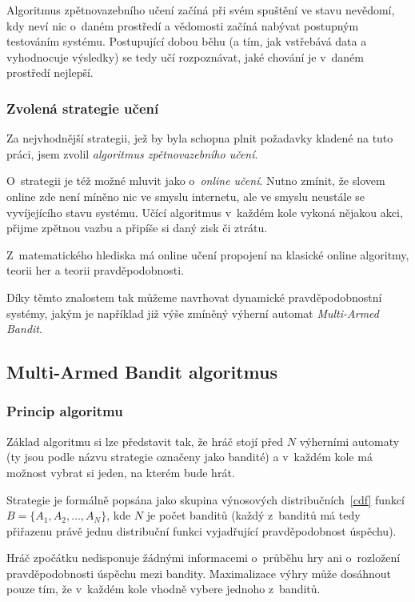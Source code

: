 \documentclass[thesis=M,czech]{FITthesis}[2014/05/07]
\begin{document}
Algoritmus zpětnovazebního učení začíná při svém spuštění ve stavu nevědomí, kdy neví nic o~daném prostředí a vědomosti začíná nabývat postupným testováním systému. Postupující dobou běhu (a tím, jak vstřebává data a vyhodnocuje výsledky) se tedy učí rozpoznávat, jaké chování je v~daném prostředí nejlepší.

\subsubsection{Zvolená strategie učení}
\label{sub:online}
Za nejvhodnější strategii, jež by byla schopna plnit požadavky kladené na tuto práci, jsem zvolil \emph{algoritmus zpětnovazebního učení}.

O~strategii je též možné mluvit jako o~\emph{online učení}. Nutno zmínit, že slovem online zde není míněno nic ve smyslu internetu, ale ve smyslu neustále se vyvíjejícího stavu systému. Učící algoritmus v~každém kole vykoná nějakou akci, přijme zpětnou vazbu a připíše si daný zisk či ztrátu.

Z~matematického hlediska má online učení propojení na klasické online algoritmy, teorii her a teorii pravděpodobnosti.

Díky těmto znalostem tak můžeme navrhovat dynamické pravděpodobnostní systémy, jakým je například již výše zmíněný výherní automat \emph{Multi-Armed Bandit}.

\subsection{Multi-Armed Bandit algoritmus}
\label{sec:multi}

\subsubsection{Princip algoritmu}
Základ algoritmu si lze představit tak, že hráč stojí před $N$ výherními automaty (ty jsou podle názvu strategie označeny jako bandité) a v~každém kole má možnost vybrat si jeden, na kterém bude hrát.

Strategie je formálně popsána jako skupina výnosových distribučních~\ref{cdf} funkcí $B = \{ A_1, A_2, \ldots, A_N \}$, kde $N$ je počet banditů (každý z~banditů má tedy přiřazenu právě jednu distribuční funkci vyjadřující pravděpodobnost úspěchu). 

Hráč zpočátku nedisponuje žádnými informacemi o~průběhu hry ani o~rozložení pravděpodobnosti úspěchu mezi bandity. Maximalizace výhry může dosáhnout pouze tím, že v~každém kole vhodně vybere jednoho z~banditů.
\end{document}
